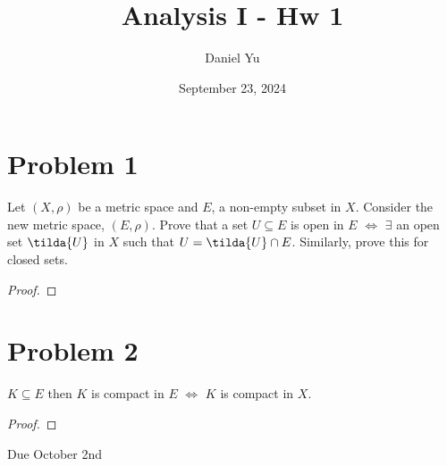 \documentclass[a4paper]{article}
\title{\Huge{Analysis I - Hw 1}}
\author{\huge{Daniel Yu}}
\date{September 23, 2024}
\begin{document}
\maketitle
\newpage%
\pagebreak

\section{Problem 1}
Let $(X,\rho)$ be a metric space and  $E$, a non-empty subset in $X$. Consider the new metric space,
$(E,\rho)$. Prove that a set $U \subseteq E$ is open in $E$ $\iff$ $\exists $ an open set $\tilda{U}$ in $X$ 
such that  $U = \tilda{U} \cap E$. Similarly, prove this for closed sets.

\begin{proof}
  
\end{proof}
 
\section{Problem 2}
$K \subseteq E$ then $K$ is compact in $E$ $\iff$ $K$ is compact in $X$. 

\begin{proof}
  
\end{proof}

\Huge{Due October 2nd}
\end{document}
